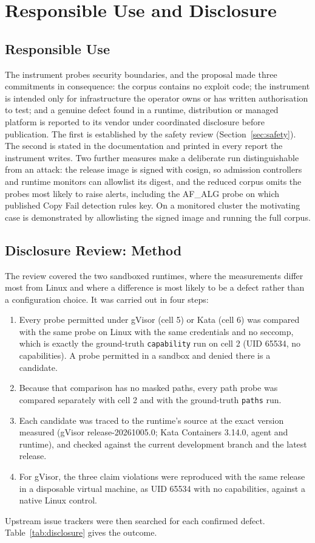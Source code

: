\chapter{Responsible Use and Disclosure}
\label{ch:disclosure}

\section{Responsible Use}

The instrument probes security boundaries, and the proposal made three commitments in consequence: the corpus contains no exploit code; the instrument is intended only for infrastructure the operator owns or has written authorisation to test; and a genuine defect found in a runtime, distribution or managed platform is reported to its vendor under coordinated disclosure before publication. The first is established by the safety review (Section~\ref{sec:safety}). The second is stated in the documentation and printed in every report the instrument writes. Two further measures make a deliberate run distinguishable from an attack: the release image is signed with cosign, so admission controllers and runtime monitors can allowlist its digest, and the reduced corpus omits the probes most likely to raise alerts, including the AF\_ALG probe on which published Copy Fail detection rules key. On a monitored cluster the motivating case is demonstrated by allowlisting the signed image and running the full corpus.

\section{Disclosure Review: Method}
\label{sec:disclosure}

The review covered the two sandboxed runtimes, where the measurements differ most from Linux and where a difference is most likely to be a defect rather than a configuration choice. It was carried out in four steps:
\begin{enumerate}[leftmargin=*]
\item Every probe permitted under gVisor (cell 5) or Kata (cell 6) was compared with the same probe on Linux with the same credentials and no seccomp, which is exactly the ground-truth \texttt{capability} run on cell 2 (UID 65534, no capabilities). A probe permitted in a sandbox and denied there is a candidate.
\item Because that comparison has no masked paths, every path probe was compared separately with cell 2 and with the ground-truth \texttt{paths} run.
\item Each candidate was traced to the runtime's source at the exact version measured (gVisor release-20261005.0; Kata Containers 3.14.0, agent and runtime), and checked against the current development branch and the latest release.
\item For gVisor, the three claim violations were reproduced with the same release in a disposable virtual machine, as UID 65534 with no capabilities, against a native Linux control.
\end{enumerate}
Upstream issue trackers were then searched for each confirmed defect. Table~\ref{tab:disclosure} gives the outcome.

